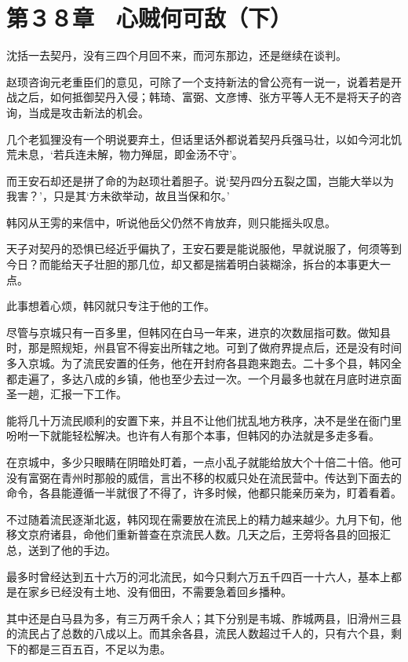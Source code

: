 \section{第３８章　心贼何可敌（下）}

沈括一去契丹，没有三四个月回不来，而河东那边，还是继续在谈判。

赵顼咨询元老重臣们的意见，可除了一个支持新法的曾公亮有一说一，说着若是开战之后，如何抵御契丹入侵；韩琦、富弼、文彦博、张方平等人无不是将天子的咨询，当成是攻击新法的机会。

几个老狐狸没有一个明说要弃土，但话里话外都说着契丹兵强马壮，以如今河北饥荒未息，‘若兵连未解，物力殚屈，即金汤不守’。

而王安石却还是拼了命的为赵顼壮着胆子。说‘契丹四分五裂之国，岂能大举以为我害？’，只是其‘方未欲举动，故且当保和尔。’

韩冈从王雱的来信中，听说他岳父仍然不肯放弃，则只能摇头叹息。

天子对契丹的恐惧已经近乎偏执了，王安石要是能说服他，早就说服了，何须等到今日？而能给天子壮胆的那几位，却又都是揣着明白装糊涂，拆台的本事更大一点。

此事想着心烦，韩冈就只专注于他的工作。

尽管与京城只有一百多里，但韩冈在白马一年来，进京的次数屈指可数。做知县时，那是照规矩，州县官不得妄出所辖之地。可到了做府界提点后，还是没有时间多入京城。为了流民安置的任务，他在开封府各县跑来跑去。二十多个县，韩冈全都走遍了，多达八成的乡镇，他也至少去过一次。一个月最多也就在月底时进京面圣一趟，汇报一下工作。

能将几十万流民顺利的安置下来，并且不让他们扰乱地方秩序，决不是坐在衙门里吩咐一下就能轻松解决。也许有人有那个本事，但韩冈的办法就是多走多看。

在京城中，多少只眼睛在阴暗处盯着，一点小乱子就能给放大个十倍二十倍。他可没有富弼在青州时那般的威信，言出不移的权威只处在流民营中。传达到下面去的命令，各县能遵循一半就很了不得了，许多时候，他都只能亲历亲为，盯着看着。

不过随着流民逐渐北返，韩冈现在需要放在流民上的精力越来越少。九月下旬，他移文京府诸县，命他们重新普查在京流民人数。几天之后，王旁将各县的回报汇总，送到了他的手边。

最多时曾经达到五十六万的河北流民，如今只剩六万五千四百一十六人，基本上都是在家乡已经没有土地、没有佃田，不需要急着回乡播种。

其中还是白马县为多，有三万两千余人；其下分别是韦城、胙城两县，旧滑州三县的流民占了总数的八成以上。而其余各县，流民人数超过千人的，只有六个县，剩下的都是三百五百，不足以为患。

